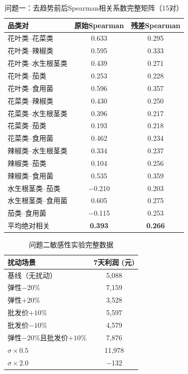 \documentclass[12pt,a4paper]{article}
\begin{document}
\begin{table}[H]
\centering
\caption{问题一：去趋势前后Spearman相关系数完整矩阵（15对）}
\begin{tabular}{lcc}
\toprule
品类对 & 原始Spearman & 残差Spearman \\
\midrule
花叶类--花菜类 & 0.633 & 0.295 \\
花叶类--辣椒类 & 0.595 & 0.333 \\
花叶类--水生根茎类 & 0.439 & 0.271 \\
花叶类--茄类 & 0.253 & 0.228 \\
花叶类--食用菌 & 0.596 & 0.357 \\
花菜类--辣椒类 & 0.430 & 0.250 \\
花菜类--水生根茎类 & 0.396 & 0.217 \\
花菜类--茄类 & 0.193 & 0.218 \\
花菜类--食用菌 & 0.462 & 0.234 \\
辣椒类--水生根茎类 & 0.334 & 0.237 \\
辣椒类--茄类 & 0.104 & 0.256 \\
辣椒类--食用菌 & 0.535 & 0.359 \\
水生根茎类--茄类 & $-$0.210 & 0.203 \\
水生根茎类--食用菌 & 0.605 & 0.275 \\
茄类--食用菌 & $-$0.115 & 0.253 \\
\midrule
平均绝对相关 & \textbf{0.393} & \textbf{0.266} \\
\bottomrule
\end{tabular}
\end{table}

\begin{table}[H]
\centering
\caption{问题二敏感性实验完整数据}
\begin{tabular}{lc}
\toprule
扰动场景 & 7天利润 (元) \\
\midrule
基线（无扰动） & 5,088 \\
弹性$-20\%$ & 7,159 \\
弹性$+20\%$ & 3,528 \\
批发价$+10\%$ & 5,597 \\
批发价$-10\%$ & 4,579 \\
弹性$-20\%$且批发价$+10\%$ & 7,876 \\
$\sigma \times 0.5$ & 11,978 \\
$\sigma \times 2.0$ & $-$132 \\
\bottomrule
\end{tabular}
\end{table}
\end{document}
